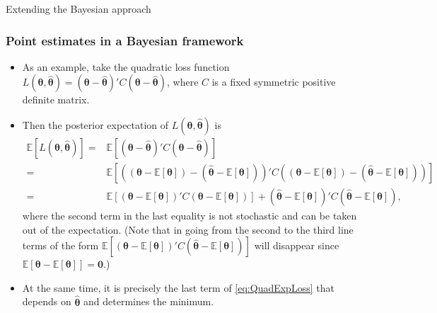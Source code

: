 \documentclass[10pt]{beamer}
\theoremstyle{definition}
\begin{document}
\begin{section}{Extending the Bayesian approach}
\begin{frame}[fragile]
\frametitle{Point estimates in a Bayesian framework}
\begin{itemize}\itemsep1em
\item As an example, take the quadratic loss function $L(\boldsymbol{\theta},\boldsymbol{\hat{\theta}})=(\boldsymbol{\theta}-\boldsymbol{\hat{\theta}})'C(\boldsymbol{\theta}-\boldsymbol{\hat{\theta}})$,
where $C$ is a fixed symmetric positive definite matrix.
\item Then the posterior expectation of $L(\boldsymbol{\theta},\boldsymbol{\hat{\theta}})$ is 
\begin{equation}
\label{eq:QuadExpLoss}\begin{split}
\mathbb{E}[L(\boldsymbol{\theta},\boldsymbol{\hat{\theta}})]=&\mathbb{E}[(\boldsymbol{\theta}-\boldsymbol{\hat{\theta}})'C(\boldsymbol{\theta}-\boldsymbol{\hat{\theta}})]\\=&\mathbb{E}[((\boldsymbol{\theta}-\mathbb{E}[\boldsymbol{\theta}])-(\boldsymbol{\hat{\theta}}-\mathbb{E}[\boldsymbol{\theta}]))'C((\boldsymbol{\theta}-\mathbb{E}[\boldsymbol{\theta}])-(\boldsymbol{\hat{\theta}}-\mathbb{E}[\boldsymbol{\theta}]))]\\=&\mathbb{E}[(\boldsymbol{\theta}-\mathbb{E}[\boldsymbol{\theta}])'C(\boldsymbol{\theta}-\mathbb{E}[\boldsymbol{\theta}])]+(\boldsymbol{\hat{\theta}}-\mathbb{E}[\boldsymbol{\theta}])'C(\boldsymbol{\hat{\theta}}-\mathbb{E}[\boldsymbol{\theta}]),
\end{split}
\end{equation}
where the second term in the last equality is not stochastic and can be taken out of the expectation. (Note that in going from the second to the third line terms of the form $ \mathbb{E}[(\boldsymbol{\theta}-\mathbb{E}[\boldsymbol{\theta}])'C (\boldsymbol{\hat{\theta}}-\mathbb{E}[\boldsymbol{\theta}])] $ will disappear since $ \mathbb{E}[\boldsymbol{\theta}-\mathbb{E}[\boldsymbol{\theta}]] = \mathbf{0}  $.)
\item At the same time, it is precisely the last term of  \eqref{eq:QuadExpLoss} that depends on $\boldsymbol{\hat{\theta}}$ and determines the minimum.
\end{itemize}
\end{frame}


\end{section}
\end{document}
